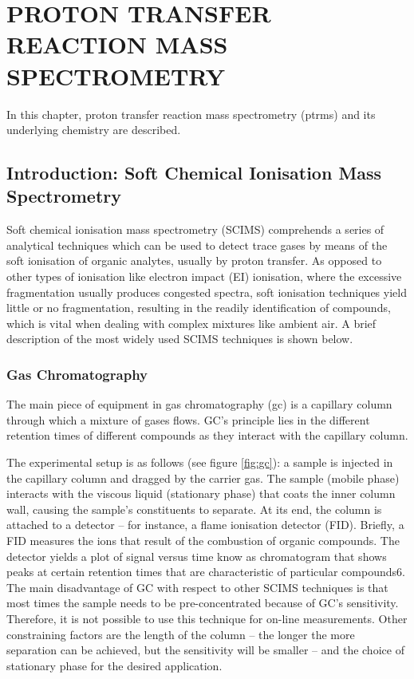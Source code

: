 \chapter{PROTON TRANSFER REACTION MASS SPECTROMETRY}

In this chapter, proton transfer reaction mass spectrometry (\acrshort{ptrms}) and its underlying chemistry are described. 



\section{Introduction: Soft Chemical Ionisation Mass Spectrometry}
Soft chemical ionisation mass spectrometry (SCIMS) comprehends a series of analytical techniques which can be used to detect trace gases by means of the soft ionisation of organic analytes, usually by proton transfer. As opposed to other types of ionisation like electron impact (EI) ionisation, where the excessive fragmentation usually produces congested spectra, soft ionisation techniques yield little or no fragmentation, resulting in the readily identification of compounds, which is vital when dealing with complex mixtures like ambient air.
A brief description of the most widely used SCIMS techniques is shown below.

\subsection{Gas Chromatography}
The main piece of equipment in gas chromatography (\acrshort{gc}) is a capillary column through which a mixture of gases flows. GC's principle lies in the different retention times of different compounds as they interact with the capillary column.

The experimental setup is as follows (see figure \ref{fig:gc}): a sample is injected in the capillary column and dragged by the carrier gas. The sample (mobile phase) interacts with the viscous liquid (stationary phase) that coats the inner column wall, causing the sample's constituents to separate. At its end, the column is attached to a detector –  for instance, a flame ionisation detector (FID). Briefly, a FID measures the ions that result of the combustion of organic compounds. The detector yields a plot of signal versus time know as chromatogram that shows peaks at certain retention times that are characteristic of particular compounds6.
The main disadvantage of GC with respect to other SCIMS techniques is that most times the sample needs to be pre-concentrated because of GC's sensitivity. Therefore, it is not possible to use this technique for on-line measurements. Other constraining factors are the length of the column – the longer the more separation can be achieved, but the sensitivity will be smaller – and the choice of stationary phase for the desired application.

